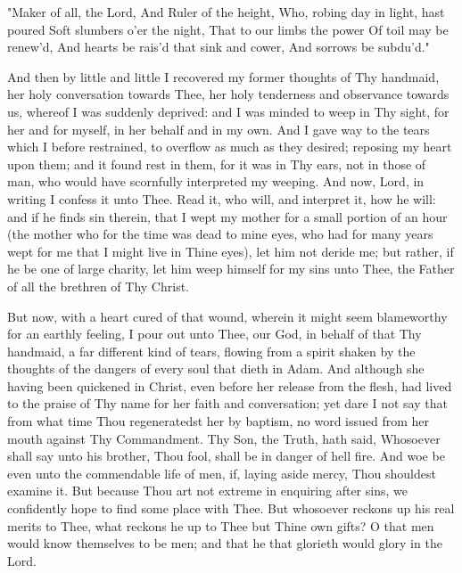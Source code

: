 \documentclass[b5paper,openright,12pt,twoside]{book}
\begin{document}
         "Maker of all, the Lord,
           And Ruler of the height,
         Who, robing day in light, hast poured
           Soft slumbers o'er the night,
         That to our limbs the power
           Of toil may be renew'd,
         And hearts be rais'd that sink and cower,
           And sorrows be subdu'd."

And then by little and little I recovered my former thoughts of Thy
handmaid, her holy conversation towards Thee, her holy tenderness and
observance towards us, whereof I was suddenly deprived: and I was minded
to weep in Thy sight, for her and for myself, in her behalf and in my
own. And I gave way to the tears which I before restrained, to overflow
as much as they desired; reposing my heart upon them; and it found rest
in them, for it was in Thy ears, not in those of man, who would have
scornfully interpreted my weeping. And now, Lord, in writing I confess
it unto Thee. Read it, who will, and interpret it, how he will: and if
he finds sin therein, that I wept my mother for a small portion of an
hour (the mother who for the time was dead to mine eyes, who had for
many years wept for me that I might live in Thine eyes), let him not
deride me; but rather, if he be one of large charity, let him weep
himself for my sins unto Thee, the Father of all the brethren of Thy
Christ.

But now, with a heart cured of that wound, wherein it might seem
blameworthy for an earthly feeling, I pour out unto Thee, our God, in
behalf of that Thy handmaid, a far different kind of tears, flowing from
a spirit shaken by the thoughts of the dangers of every soul that dieth
in Adam. And although she having been quickened in Christ, even before
her release from the flesh, had lived to the praise of Thy name for
her faith and conversation; yet dare I not say that from what time Thou
regeneratedst her by baptism, no word issued from her mouth against Thy
Commandment. Thy Son, the Truth, hath said, Whosoever shall say unto
his brother, Thou fool, shall be in danger of hell fire. And woe be even
unto the commendable life of men, if, laying aside mercy, Thou shouldest
examine it. But because Thou art not extreme in enquiring after sins, we
confidently hope to find some place with Thee. But whosoever reckons up
his real merits to Thee, what reckons he up to Thee but Thine own gifts?
O that men would know themselves to be men; and that he that glorieth
would glory in the Lord.
\end{document}
